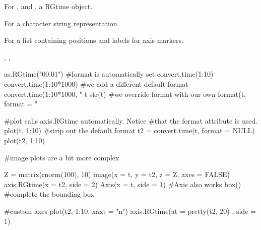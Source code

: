\documentclass[a4paper]{book}
\begin{document}
%
\begin{Value}
For ,  and , a RGtime object.

For  a character string representation.

For  a list containing positions and labels for axis markers.
\end{Value}
%
\begin{SeeAlso}\relax
{}, , 
\end{SeeAlso}
%
\begin{Examples}
\begin{ExampleCode}
as.RGtime("00:01")
#format is automatically set
convert.time(1:10)
convert.time(1:10*1000)
#we add a different default format
convert.time(1:10*1000, "%
t
str(t)
#we override format with our own
format(t, format = "%

#plot calls axis.RGtime automatically. Notice
#that the format attribute is used.
plot(t, 1:10)
#strip out the default format
t2 = convert.time(t, format = NULL)
plot(t2, 1:10)

#image plots are a bit more complex

Z = matrix(rnorm(100), 10)
image(x = t, y = t2, z = Z, axes = FALSE)
axis.RGtime(x = t2, side = 2)
Axis(x = t, side = 1) #Axis also works
box() #complete the bounding box

#custom axes
plot(t2, 1:10, xaxt = "n")
axis.RGtime(at = pretty(t2, 20) , side = 1)
\end{ExampleCode}
\end{Examples}
\printindex{}
\end{document}
